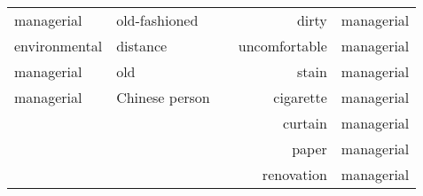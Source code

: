 \begin{table}[hbp]
{\begin{tabular}{lll|r|r|}
\multicolumn{1}{|l|}{managerial} & \multicolumn{1}{l|}{old-fashioned} &  & dirty & managerial \\ \cline{1-2} \cline{4-5} 
\multicolumn{1}{|l|}{environmental} & \multicolumn{1}{l|}{distance} &  & uncomfortable & managerial \\ \cline{1-2} \cline{4-5} 
\multicolumn{1}{|l|}{managerial} & \multicolumn{1}{l|}{old} &  & stain & managerial \\ \cline{1-2} \cline{4-5} 
\multicolumn{1}{|l|}{managerial} & \multicolumn{1}{l|}{Chinese person} &  & cigarette & managerial \\ \cline{1-2} \cline{4-5} 
 &  &  & curtain & managerial \\ \cline{4-5} 
 &  &  & paper & managerial \\ \cline{4-5} 
 &  &  & renovation & managerial \\ \cline{4-5} 
\end{tabular}%
}
\end{table}




